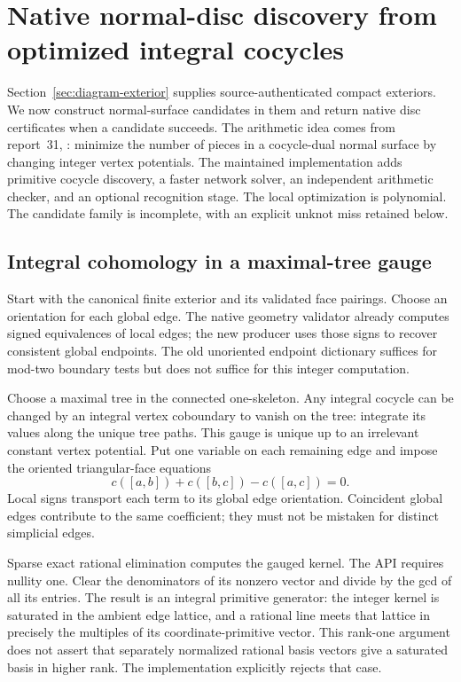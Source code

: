 \section{Native normal-disc discovery from optimized integral cocycles}
\label{sec:cocycle-seeds}

Section~\ref{sec:diagram-exterior} supplies source-authenticated compact
exteriors. We now construct normal-surface candidates in them and return
native disc certificates when a candidate succeeds. The arithmetic idea
comes from report~31, :
minimize the number of pieces in a cocycle-dual normal surface by changing
integer vertex potentials. The maintained implementation adds primitive
cocycle discovery, a faster network solver, an independent arithmetic
checker, and an optional recognition stage. The local optimization is
polynomial. The candidate family is incomplete, with an explicit unknot
miss retained below.

\subsection{Integral cohomology in a maximal-tree gauge}

Start with the canonical finite exterior and its validated face pairings.
Choose an orientation for each global edge. The native geometry validator
already computes signed equivalences of local edges; the new producer uses
those signs to recover consistent global endpoints. The old unoriented
endpoint dictionary suffices for mod-two boundary tests but does not suffice
for this integer computation.

Choose a maximal tree in the connected one-skeleton. Any integral cocycle
can be changed by an integral vertex coboundary to vanish on the tree:
integrate its values along the unique tree paths. This gauge is unique up to
an irrelevant constant vertex potential. Put one variable on each remaining
edge and impose the oriented triangular-face equations
\[
 c([a,b])+c([b,c])-c([a,c])=0.
\]
Local signs transport each term to its global edge orientation. Coincident
global edges contribute to the same coefficient; they must not be mistaken
for distinct simplicial edges.

Sparse exact rational elimination computes the gauged kernel. The API
requires nullity one. Clear the denominators of its nonzero vector and
divide by the gcd of all its entries. The result is an integral primitive
generator: the integer kernel is saturated in the ambient edge lattice,
and a rational line meets that lattice in precisely the multiples of its
coordinate-primitive vector. This rank-one argument does not assert that
separately normalized rational basis vectors give a saturated basis in
higher rank. The implementation explicitly rejects that case.

